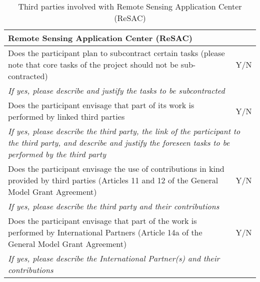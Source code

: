 \begin{table}[H]
	\centering
	\begin{tabular}{|p{10cm}|p{4cm}|}
		\hline
		
		\multicolumn{2}{|p{14cm}|}{\textbf{Remote Sensing Application Center (ReSAC)}}\\
		
		\hline
		
		Does the participant plan to subcontract certain tasks (please note that core tasks of the project should not be sub-contracted) & Y/N\\
		
		\hline
		
		\multicolumn{2}{|p{14cm}|}{\textit{If yes, please describe and justify the tasks to be subcontracted}}\\
		
		\hline
		
		Does the participant envisage that part of its work is performed by linked third parties & Y/N\\
		
		\hline
		
		\multicolumn{2}{|p{14cm}|}{\textit{If yes, please describe the third party, the link of the participant to the third party, and describe and justify the foreseen tasks to be performed by the third party}}\\
		
		\hline
		
		Does the participant envisage the use of contributions in kind provided by third parties (Articles 11 and 12 of the General Model Grant Agreement) & Y/N\\
		
		\hline
		
		\multicolumn{2}{|p{14cm}|}{\textit{If yes, please describe the third party and their contributions}}\\
		
		\hline
		
		Does the participant envisage that part of the work is performed by International Partners (Article 14a of the General Model Grant Agreement) & Y/N\\
		
		\hline
		
		\multicolumn{2}{|p{14cm}|}{\textit{If yes, please describe the International Partner(s) and their contributions}}\\
		
		\hline
	\end{tabular}
	\caption{Third parties involved with Remote Sensing Application Center (ReSAC)}
\end{table}



